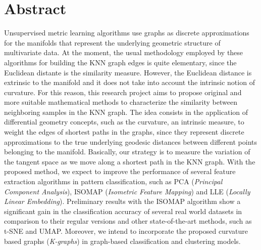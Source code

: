 \documentclass[a4paper,12pt]{article}
\begin{document}
\section*{Abstract}
\noindent
Unsupervised metric learning algorithms use graphs as discrete approximations for the manifolds that represent the underlying geometric structure of multivariate data. At the moment, the usual methodology employed by these algorithms for building the KNN graph edges is quite elementary, since the Euclidean distante is the similarity measure. However, the Euclidean distance is extrinsic to the manifold and it does not take into account the intrinsic notion of curvature. For this reason, this research project aims to propose original and more suitable mathematical methods to characterize the similarity between neighboring samples in the KNN graph. The idea consists in the application of differential geometry concepts, such as the curvature, an intrinsic measure, to weight the edges of shortest paths in the graphs, since they represent discrete approximations to the true underlying geodesic distances between different points belonging to the manifold. Basically, our strategy is to measure the variation of the tangent space as we move along a shortest path in the KNN graph. With the proposed method, we expect to improve the performance of several feature extraction algorithms in pattern classification, such as PCA (\emph{Principal Component Analysis}), ISOMAP (\emph{Isometric Feature Mapping}) and LLE (\emph{Locally Linear Embedding}). Preliminary results with the ISOMAP algorithm show a significant gain in the classification accuracy of several real world datasets in comparison to their regular versions and other state-of-the-art methods, such as t-SNE and UMAP. Moreover, we intend to incorporate the proposed curvature based graphs (\emph{K-graphs}) in graph-based classification and clustering models.

\newpage
\end{document}
